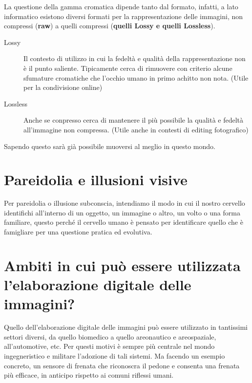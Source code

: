 \begin{nota}
  La questione della gamma cromatica dipende tanto dal formato, infatti,
  a lato informatico esistono diversi formati per la rappresentazione
  delle immagini, non compressi (\textbf{\color{red}raw}) a quelli
  compressi (\textbf{\color{blue}quelli Lossy e quelli Lossless}).
  \begin{description}
  \item[Lossy] Il contesto di utilizzo in cui la fedeltà e qualità della
    rappresentazione non è il punto saliente. Tipicamente cerca di
    rimuovere con criterio alcune sfumature cromatiche che l'occhio umano
    in primo achitto non nota. (Utile per la condivisione online)
  \item[Lossless] Anche se conpresso cerca di mantenere il più possibile
    la qualità e fedeltà all'immagine non compressa. (Utile anche in
    contesti di editing fotografico)
  \end{description}
  Sapendo questo sarà già possibile muoversi al meglio in questo mondo.
\end{nota}

\section{Pareidolia e illusioni visive}
\label{sec:pareidolia}
Per pareidolia o illusione subconscia, intendiamo il modo in cui il
nostro cervello identifichi all'interno di un oggetto, un immagine o
altro, un volto o una forma familiare, questo perché il cervello umano
è pensato per identificare quello che è famigliare per una questione
pratica ed evolutiva.

\section{Ambiti in cui può essere utilizzata l'elaborazione digitale
  delle immagini?}
\label{sec:ambito}
Quello dell'elaborazione digitale delle immagini può essere utilizzato in
tantissimi settori diversi, da quello biomedico a quello areonautico e
areospaziale, all'automotive, etc. Per questi motivi è sempre più
centrale nel mondo ingegneristico e militare l'adozione di tali sistemi.
Ma facendo un esempio concreto, un sensore di frenata che riconoscra il
pedone e consenta una frenata più efficace, in anticipo rispetto ai
comuni riflessi umani.
